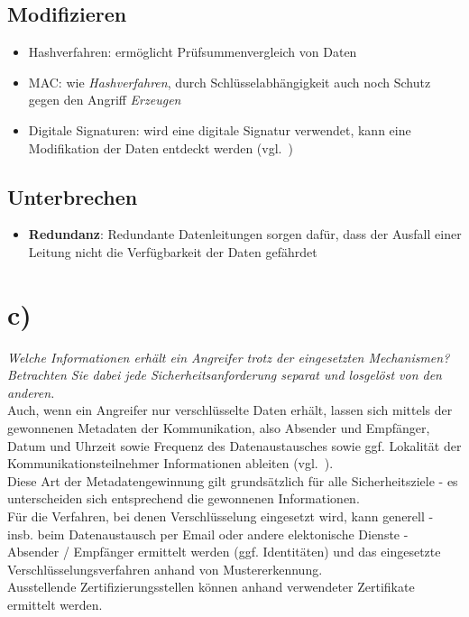 \subsection*{Modifizieren}
\begin{itemize}
    \itemsep0.5em
    \item {Hashverfahren}: ermöglicht Prüfsummenvergleich von Daten
    \item {MAC}: wie \textit{Hashverfahren}, durch Schlüsselabhängigkeit auch noch Schutz gegen den Angriff \textit{Erzeugen}
    \item {Digitale Signaturen}: wird eine digitale Signatur verwendet, kann eine Modifikation der Daten entdeckt werden (vgl.~\cite[382]{Eck18})
\end{itemize}


\subsection*{Unterbrechen}
\begin{itemize}
    \itemsep0.5em
    \item \textbf{Redundanz}: Redundante Datenleitungen sorgen dafür, dass der Ausfall einer Leitung nicht die Verfügbarkeit der Daten gefährdet
\end{itemize}

\section{c)}

\textit{Welche Informationen erhält ein Angreifer trotz der eingesetzten Mechanismen?
Betrachten Sie dabei jede Sicherheitsanforderung separat und losgelöst von den
anderen.}\\

\noindent
Auch, wenn ein Angreifer nur verschlüsselte Daten erhält, lassen sich mittels der gewonnenen Metadaten der Kommunikation, also Absender und Empfänger, Datum und Uhrzeit sowie Frequenz des Datenaustausches sowie ggf. Lokalität der Kommunikationsteilnehmer Informationen ableiten (vgl.~\cite[25 f.]{Sch15b}). \\
Diese Art der Metadatengewinnung gilt grundsätzlich für alle Sicherheitsziele - es unterscheiden sich entsprechend die gewonnenen Informationen.\\
Für die Verfahren, bei denen Verschlüsselung eingesetzt wird, kann generell - insb. beim Datenaustausch per Email oder andere elektonische Dienste - Absender / Empfänger ermittelt werden (ggf. Identitäten) und das eingesetzte Verschlüsselungsverfahren anhand von Mustererkennung.\\
Ausstellende Zertifizierungsstellen können anhand verwendeter Zertifikate ermittelt werden.

